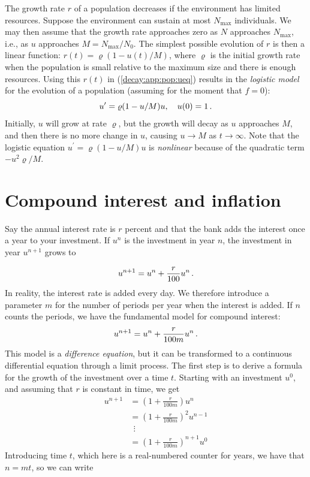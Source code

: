 \documentclass[%
oneside,                 %
final,                   %
10pt]{article}
\begin{document}

The growth rate $r$ of a population decreases if the environment
has limited resources. Suppose the environment can sustain at
most $N_{\max}$ individuals. We may then assume that the growth rate
approaches zero as $N$ approaches $N_{\max}$, i.e., as $u$ approaches
$M=N_{\max}/N_0$. The simplest possible evolution of $r$ is then a
linear function: $r(t)={\varrho}(1-u(t)/M)$, where $\varrho$
is the initial growth rate when the population is small relative to the
maximum size and there is enough resources. Using this $r(t)$ in
(\ref{decay:app:pop:ueq}) results in the \emph{logistic model} for the
evolution of a population (assuming for the moment that $f=0$):
\begin{equation}
u^{\prime} = {\varrho}(1-u/M)u,\quad u(0)=1
\tp
\label{decay:app:pop:logistic}
\end{equation}
Initially, $u$ will grow at rate $\varrho$, but the growth will decay
as $u$ approaches $M$, and then there is no more change in $u$, causing
$u\rightarrow M$ as $t\rightarrow\infty$.
Note that the logistic equation $u^{\prime}={\varrho}(1-u/M)u$ is \emph{nonlinear} because
of the quadratic term $-u^2{\varrho}/M$.

\section{Compound interest and inflation}
\label{decay:app:interest}

Say the annual interest rate is $r$ percent and that the bank
adds the interest once a year to your investment.
If $u^n$ is the investment in year $n$, the investment in year $u^{n+1}$
grows to

\[ u^{n+1} = u^n + \frac{r}{100}u^n
\tp  \]
In reality, the interest rate is added every day. We therefore introduce
a parameter $m$ for the number of periods per year when the interest
is added. If $n$ counts the periods, we have the fundamental model
for compound interest:
\begin{equation}
u^{n+1} = u^n + \frac{r}{100 m}u^n
\tp
\label{decay:app:interest:eq1}
\end{equation}
This model is a \emph{difference equation}, but it can be transformed to a
continuous differential equation through a limit process.
The first step is to derive a formula for the growth of the investment
over a time $t$.
Starting with an investment $u^0$, and assuming that $r$ is constant in time,
we get
\begin{align*}
u^{n+1} &= \left(1 + \frac{r}{100 m}\right)u^{n}\\ 
&= \left(1 + \frac{r}{100 m}\right)^2u^{n-1}\\ 
&\ \ \vdots\\ 
&= \left(1 +\frac{r}{100 m}\right)^{n+1}u^{0}
\end{align*}
Introducing time $t$, which here is a real-numbered counter for years,
we have that $n=mt$, so we can write
\end{document}
